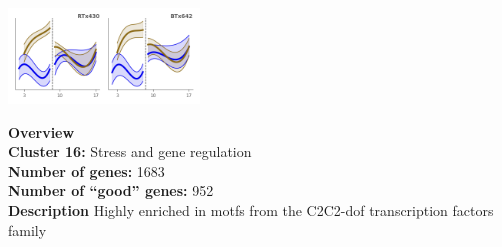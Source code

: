 \begin{multicols}{2}
\includegraphics[width=2in]{figures/clusters/root_Preflowering_15.png}
\columnbreak

\noindent \textbf{Overview}\\\textbf{Cluster 16:} Stress and gene regulation \\
\textbf{Number of genes:} 1683 \\
\textbf{Number of ``good'' genes:} 952 \\
\textbf{Description} Highly enriched in motfs from the C2C2-dof transcription factors family \\
\end{multicols}


